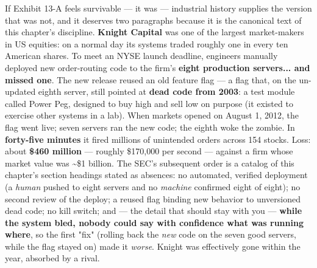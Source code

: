 If Exhibit 13-A feels survivable — it was — industrial history supplies the version that was not, and it deserves two paragraphs because it is the canonical text of this chapter's discipline. \textbf{Knight Capital} was one of the largest market-makers in US equities: on a normal day its systems traded roughly one in every ten American shares. To meet an NYSE launch deadline, engineers manually deployed new order-routing code to the firm's \textbf{eight production servers... and missed one}. The new release reused an old feature flag — a flag that, on the un-updated eighth server, still pointed at \textbf{dead code from 2003}: a test module called Power Peg, designed to buy high and sell low on purpose (it existed to exercise other systems in a lab). When markets opened on August 1, 2012, the flag went live; seven servers ran the new code; the eighth woke the zombie. In \textbf{forty-five minutes} it fired millions of unintended orders across 154 stocks. Loss: about \textbf{\$460 million} — roughly \$170,000 per second — against a firm whose market value was \textasciitilde{}\$1 billion. The SEC's subsequent order is a catalog of this chapter's section headings stated as absences: no automated, verified deployment (a \textit{human} pushed to eight servers and no \textit{machine} confirmed eight of eight); no second review of the deploy; a reused flag binding new behavior to unversioned dead code; no kill switch; and — the detail that should stay with you — \textbf{while the system bled, nobody could say with confidence what was running where}, so the first "fix" (rolling back the \textit{new} code on the seven good servers, while the flag stayed on) made it \textit{worse}. Knight was effectively gone within the year, absorbed by a rival.

